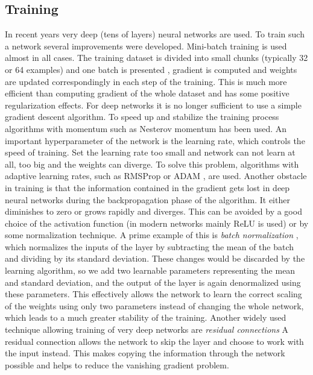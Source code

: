 \subsection{Training}
In recent years very deep (tens of layers) neural networks are used. To train such a network several improvements were developed. Mini-batch training is used almost in all cases. The training dataset is divided into small chunks (typically 32 or 64 examples) and one batch is presented , gradient is computed and weights are updated correspondingly in each step of the training. This is much more efficient than computing gradient of the whole dataset and has some positive regularization effects. 
For deep networks it is no longer sufficient to use a simple gradient descent algorithm. To speed up and stabilize the training process algorithms with momentum such as Nesterov momentum \cite{sutskever_importance_2013} has been used. 
An important hyperparameter of the network is the learning rate, which controls the speed of training. Set the learning rate too small and network can not learn at all, too big and the weights can diverge. To solve this problem, algorithms with adaptive learning rates, such as 
RMSProp \cite{hinton_neural_nodate} or ADAM \cite{kingma_adam:_2014}, are used.
Another obstacle in training is that the information contained in the gradient gets lost in deep neural networks during the backpropagation phase of the algorithm. It either diminishes to zero or grows rapidly and diverges. This can be avoided by a good choice of the activation function (in modern networks mainly ReLU is used) or by some normalization technique. A prime example of this is \textit{batch normalization} \cite{ioffe_batch_2015}, which normalizes the inputs of the layer by subtracting the mean of the batch and dividing by its standard deviation. These changes would be discarded by the learning algorithm, so we add two learnable parameters representing the mean and standard deviation, and the output of the layer is again denormalized using these parameters. This effectively allows the network to learn the correct scaling of the weights using only two parameters instead of changing the whole network, which leads to a much greater stability of the training.
Another widely used technique allowing training of very deep networks are \textit{residual connections} \cite{szegedy_inception-v4_2016} A residual connection allows the network to skip the layer and choose to work with the input instead. This makes copying the information through the network possible and helps to reduce the vanishing gradient problem.

